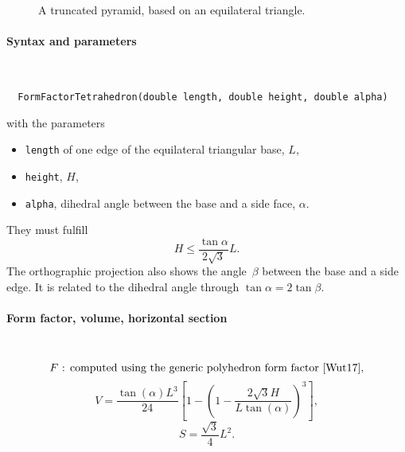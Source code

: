 \begin{figure}[H]
\hfill
{}
\hfill
{}
\hfill
{}
\hfill
\caption{A truncated pyramid, based on an equilateral triangle.}
\end{figure}

\FloatBarrier

\paragraph{Syntax and parameters}\strut\\[-2ex plus .2ex minus .2ex]
\begin{lstlisting}
  FormFactorTetrahedron(double length, double height, double alpha)
\end{lstlisting}
with the parameters
\begin{itemize}
\item \texttt{length} of one edge of the equilateral triangular base, $L$,
\item \texttt{height}, $H$,
\item \texttt{alpha}, dihedral angle between the base and a side face, $\alpha$.
\end{itemize}
They must fulfill
\begin{displaymath}
  H\le \frac{\tan{\alpha}}{2\sqrt{3}} L.
\end{displaymath}
The orthographic projection also shows the angle~$\beta$ between the base and a side edge.
It is related to the dihedral angle through $\tan \alpha = 2 \tan \beta$.

\paragraph{Form factor, volume, horizontal section}\strut\\
\begin{equation*}
  F\text{~: computed using the generic polyhedron form factor~\cite{Wut17},}
\end{equation*}
\begin{equation*}
  V= \dfrac{\tan(\alpha) L^3}{24} \left[1- \left(1 -
  \dfrac{2\sqrt{3} H}{L \tan(\alpha)} \right)^3\right],
\end{equation*}
\begin{equation*}
  S =\dfrac{\sqrt{3}}{4}L^2.
\end{equation*}

